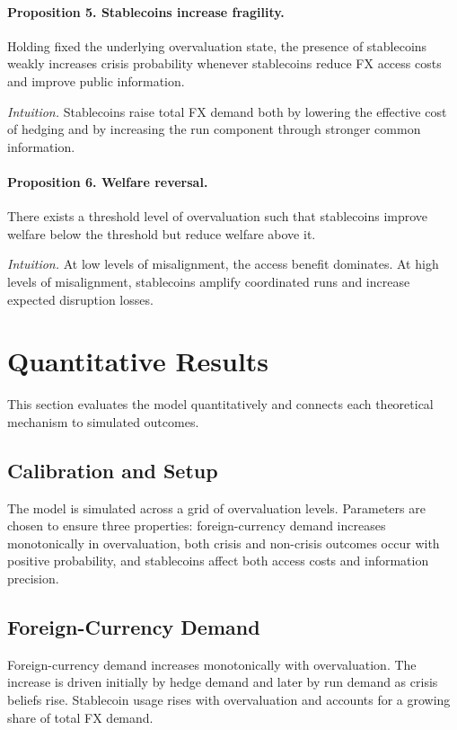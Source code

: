 \documentclass[12pt]{article}
\begin{document}
\paragraph{Proposition 5. Stablecoins increase fragility.}
Holding fixed the underlying overvaluation state, the presence of stablecoins weakly increases crisis probability whenever stablecoins reduce FX access costs and improve public information.

\emph{Intuition.} Stablecoins raise total FX demand both by lowering the effective cost of hedging and by increasing the run component through stronger common information.

\paragraph{Proposition 6. Welfare reversal.}
There exists a threshold level of overvaluation such that stablecoins improve welfare below the threshold but reduce welfare above it.

\emph{Intuition.} At low levels of misalignment, the access benefit dominates. At high levels of misalignment, stablecoins amplify coordinated runs and increase expected disruption losses.

\section{Quantitative Results}

This section evaluates the model quantitatively and connects each theoretical mechanism to simulated outcomes.

\subsection{Calibration and Setup}

The model is simulated across a grid of overvaluation levels. Parameters are chosen to ensure three properties: foreign-currency demand increases monotonically in overvaluation, both crisis and non-crisis outcomes occur with positive probability, and stablecoins affect both access costs and information precision.

\subsection{Foreign-Currency Demand}

Foreign-currency demand increases monotonically with overvaluation. The increase is driven initially by hedge demand and later by run demand as crisis beliefs rise. Stablecoin usage rises with overvaluation and accounts for a growing share of total FX demand.
\end{document}
